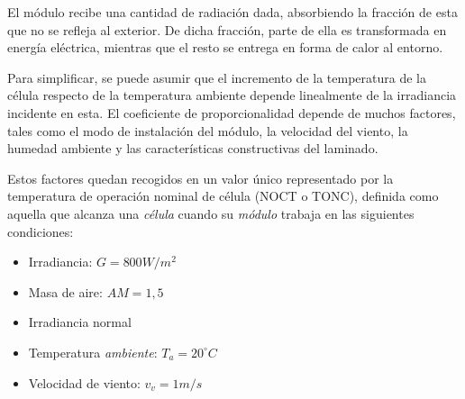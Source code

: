 El módulo recibe una cantidad de radiación dada, absorbiendo la fracción de esta que no se refleja al exterior. De dicha fracción, parte de ella es transformada en energía eléctrica, mientras que el resto se entrega en forma de calor al entorno.

Para simplificar, se puede asumir que el incremento de la temperatura de la célula respecto de la temperatura ambiente depende linealmente de la irradiancia incidente en esta. El coeficiente de proporcionalidad depende de muchos factores, tales como el modo de instalación del módulo, la velocidad del viento, la humedad ambiente y las características constructivas del laminado.

Estos factores quedan recogidos en un valor único representado por la temperatura de operación nominal de célula (NOCT o TONC), definida como aquella que alcanza una \emph{célula} cuando su \emph{módulo} trabaja en las siguientes condiciones:
\begin{itemize}
\item Irradiancia: \(G=800W/m^2\)
\item Masa de aire: \(AM= 1,5\)
\item Irradiancia normal
\item Temperatura \emph{ambiente}: \(T_a=20^\circ C\)
\item Velocidad de viento: \(v_v=1m/s\)
\end{itemize}

